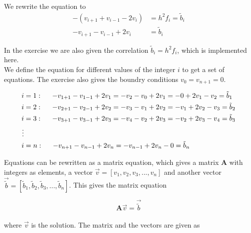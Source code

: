 \documentclass{article}
\begin{document}
  We rewrite the equation to
  \begin{align*}
    - (v_{i+1} + v_{i-1} - 2 v_i) &= h^2 f_i = \tilde{b}_i \\
    - v_{i+1} - v_{i-1} + 2 v_i &= \tilde{b}_i
  \end{align*}

  In the exercise we are also given the correlation $\tilde{b}_i = h^2 f_i$, which is implemented here. \\

  We define the equation for different values of the integer $i$ to get a set of equations. The exercise also gives the boundry conditions $v_0 = v_{n+1} = 0$.

  \begin{align*}
    i &= 1 : \hspace{5mm} - v_{1+1} - v_{1-1} + 2 v_1 = - v_2 - v_0 + 2 v_1 = - 0 + 2 v_1 - v_2 = \tilde{b}_1 \\
    i &= 2 : \hspace{5mm} - v_{2+1} - v_{2-1} + 2 v_2 = - v_3 - v_1 + 2 v_2 = - v_1 + 2 v_2 - v_3 = \tilde{b}_2 \\
    i &= 3 : \hspace{5mm} - v_{3+1} - v_{3-1} + 2 v_3 = - v_4 - v_2 + 2 v_3 = - v_2 + 2 v_3 - v_4 = \tilde{b}_3 \\
    \vdots \\
    i &= n : \hspace{5mm} - v_{n+1} - v_{n-1} + 2 v_n = - v_{n-1} + 2 v_n - 0 = \tilde{b}_n \\
  \end{align*}

  Equations can be rewritten as a matrix equation, which gives a matrix \textbf{A} with integers as elements, a vector $\vec{v} = [v_1, v_2, v_3, ... , v_n]$ and another vector $\vec{\tilde{b}} = [\tilde{b}_1, \tilde{b}_2, \tilde{b}_3, ... , \tilde{b}_n]$. This gives the matrix equation

  \begin{equation}
    \textbf{A} \vec{v} = \vec{\tilde{b}}  \label{eq:matrixeq}
  \end{equation} \\

  where $\vec{v}$ is the solution. The matrix and the vectors are given as
\end{document}
